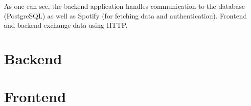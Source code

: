As one can see, the backend application handles communication to the database (PostgreSQL) as well as Spotify (for fetching data and authentication). Frontend and backend exchange data using \ac{HTTP}.

\section{Backend}

\section{Frontend}
